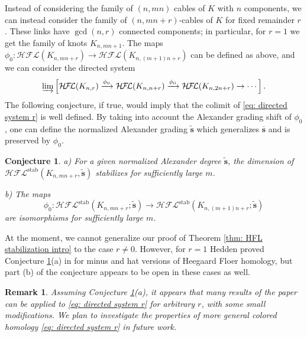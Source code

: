 \documentclass{amsart}
\newtheorem{conjecture}[theorem]{Conjecture}
\newtheorem{remark}[theorem]{Remark}
\newcommand{\cHFL}{\mathcal{H\!F\! L}}
\renewcommand{\AA}[1]{{\color{blue}#1}}
\newcommand{\cc}{\mathbf{c}}
\newcommand{\stab}{\mathrm{stab}}
\renewcommand{\ss}{\mathbf{s}}
\begin{document}
Instead of considering the family of $(n,mn)$ cables of $K$ with $n$ components, we can instead consider the family of $(n,mn+r)$-cables  of $K$ for fixed remainder $r$. These links have $\gcd(n,r)$ connected components; in particular, for $r=1$ we get the family of knots $K_{n,mn+1}$. The maps 
$\phi_0:\cHFL(K_{n,mn+r})\to \cHFL(K_{n,(m+1)n+r})$ can be defined as above, and  we can consider the directed system 
\begin{equation}
\label{eq: directed system r}
\varinjlim\left[\cHFL(K_{n,r})\xrightarrow{\phi_0}\cHFL(K_{n,n+r})\xrightarrow{\phi_0}\cHFL(K_{n,2n+r})\to\cdots\right].
\end{equation}
The following conjecture, if true, would imply that the colimit of \eqref{eq: directed system r} is well defined. By taking into account the Alexander grading shift of $\phi_0$, one can define the normalized Alexander grading $\widetilde{\ss}$ which generalizes $\overline{\ss}$ and is preserved by $\phi_0$.

\begin{conjecture}
\label{conj: intro r}
a) For a given normalized Alexander degree $\widetilde{\ss}$, the dimension of $\cHFL^{\stab}(K_{n,mn+r},\widetilde{\ss})$ stabilizes for sufficiently large $m$. 

b) The maps
$$
\phi_0:\cHFL^{\stab}\left(K_{n,mn+r};\widetilde{\ss}\right)\to \cHFL^{\stab}\left(K_{n,(m+1)n+r};\widetilde{\ss}\right)
$$
are isomorphisms for sufficiently large $m$.
\end{conjecture}
 
At the moment, we cannot generalize our proof of Theorem \ref{thm: HFL stabilization intro} to the case $r\neq 0$. However, for $r=1$ Hedden proved Conjecture \ref{conj: intro r}(a) in \cite{Hedden,Hedden2} for minus and hat versions of Heegaard Floer homology, but part (b) of the conjecture appears to be open in these cases as well. 

\begin{remark}
Assuming Conjecture \ref{conj: intro r}(a), it appears that many results of the paper can be applied to \eqref{eq: directed system r} for arbitrary $r$, with some small modifications. We plan to investigate the properties of more general colored homology \eqref{eq: directed system r} in future work.
\end{remark}
\end{document}
